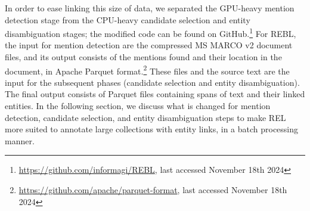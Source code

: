In order to ease linking this size of data, we separated the GPU-heavy mention detection stage from the CPU-heavy candidate selection and entity disambiguation stages; the modified code can be found on GitHub.\footnote{\url{https://github.com/informagi/REBL}, last accessed November 18th 2024}
For REBL, the input for mention detection are the compressed MS MARCO v2 document files, and its output consists of the mentions found and their location in the document, in Apache Parquet format.\footnote{\url{https://github.com/apache/parquet-format}, last accessed November 18th 2024}
These files and the source text are the input for the subsequent phases (candidate selection and entity disambiguation). The final output consists of Parquet files containing spans of text and their linked entities. 
In the following section, we discuss what is changed for mention detection, candidate selection, and entity disambiguation steps to make REL more suited to annotate large collections with entity links, in a batch processing manner.  

